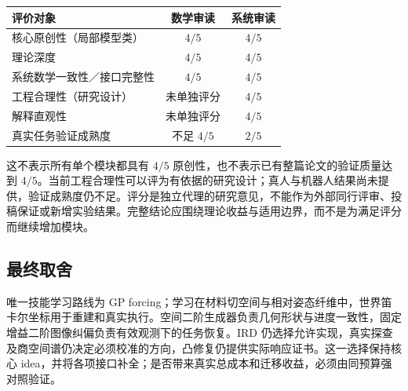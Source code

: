 \documentclass[11pt,a4paper]{article}
\numberwithin{equation}{section}
\theoremstyle{definition}
\begin{document}
\begin{center}\small
\begin{tabularx}{\linewidth}{Ycc}
\toprule
评价对象 & 数学审读 & 系统审读\\
\midrule
核心原创性（局部模型类） & $4/5$ & $4/5$\\
理论深度 & $4/5$ & $4/5$\\
系统数学一致性／接口完整性 & $4/5$ & $4/5$\\
工程合理性（研究设计） & 未单独评分 & $4/5$\\
解释直观性 & 未单独评分 & $4/5$\\
真实任务验证成熟度 & 不足 $4/5$ & $2/5$\\
\bottomrule
\end{tabularx}\end{center}

这不表示所有单个模块都具有 $4/5$ 原创性，也不表示已有整篇论文的验证质量达到 $4/5$。当前工程合理性可以评为有依据的研究设计；真人与机器人结果尚未提供，验证成熟度仍不足。评分是独立代理的研究意见，不能作为外部同行评审、投稿保证或新增实验结果。完整结论应围绕理论收益与适用边界，而不是为满足评分而继续增加模块。

\subsection{最终取舍}
唯一技能学习路线为 GP forcing；学习在材料切空间与相对姿态纤维中，世界笛卡尔坐标用于重建和真实执行。空间二阶生成器负责几何形状与进度一致性，固定增益二阶图像纠偏负责有效观测下的任务恢复。IRD 仍选择允许实现，真实探查及商空间谱仍决定必须校准的方向，凸修复仍提供实际响应证书。这一选择保持核心 idea，并将各项接口补全；是否带来真实总成本和迁移收益，必须由同预算强对照验证。
\end{document}
